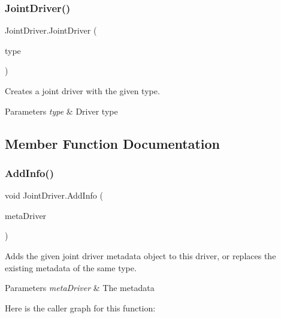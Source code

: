 \subsubsection{\texorpdfstring{Joint\+Driver()}{JointDriver()}\hspace{0.1cm}{\footnotesize\ttfamily [2/2]}}
{\footnotesize\ttfamily Joint\+Driver.\+Joint\+Driver (\begin{DoxyParamCaption}\item[{Joint\+Driver\+Type}]{type }\end{DoxyParamCaption})}



Creates a joint driver with the given type. 


\begin{DoxyParams}{Parameters}
{\em type} & Driver type\\
\hline
\end{DoxyParams}


\subsection{Member Function Documentation}
\mbox{\label{class_joint_driver_a7b35af4634caa4dbcbe3cd88ba365a68}} 
\subsubsection{\texorpdfstring{Add\+Info()}{AddInfo()}}
{\footnotesize\ttfamily void Joint\+Driver.\+Add\+Info (\begin{DoxyParamCaption}\item[{\hyperlink{class_joint_driver_meta}{Joint\+Driver\+Meta}}]{meta\+Driver }\end{DoxyParamCaption})}



Adds the given joint driver metadata object to this driver, or replaces the existing metadata of the same type. 


\begin{DoxyParams}{Parameters}
{\em meta\+Driver} & The metadata\\
\hline
\end{DoxyParams}
Here is the caller graph for this function\+:
\mbox{\label{class_joint_driver_adea8023e289a40e4d232cbac87e6a6e3}} 
